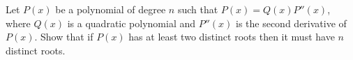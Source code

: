 Let $P(x)$ be a polynomial of degree $n$ such that $P(x)=Q(x)P''(x)$,
where $Q(x)$ is a quadratic polynomial and $P''(x)$ is the second
derivative of $P(x)$.  Show that if $P(x)$ has at least two distinct
roots then it must have $n$ distinct roots.
